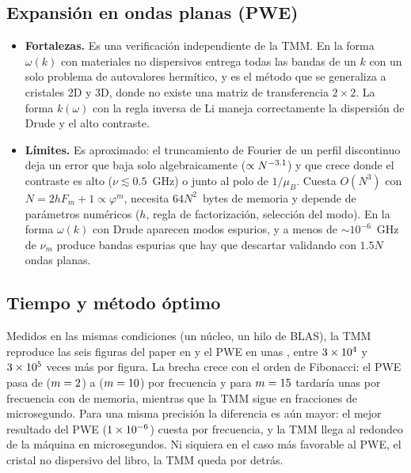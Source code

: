 \documentclass[11pt,a4paper]{article}
\begin{document}
\subsection*{Expansión en ondas planas (PWE)}

\begin{itemize}
\item \textbf{Fortalezas.} Es una verificación independiente de la TMM. En la
forma $\omega(k)$ con materiales no dispersivos entrega todas las bandas de un $k$
con un solo problema de autovalores hermítico, y es el método que se generaliza a
cristales 2D y 3D, donde no existe una matriz de transferencia $2\times2$. La forma
$k(\omega)$ con la regla inversa de Li maneja correctamente la dispersión de Drude
y el alto contraste.
\item \textbf{Límites.} Es aproximado: el truncamiento de Fourier de un perfil
discontinuo deja un error que baja solo algebraicamente
($\propto N^{-3.1}$) y que crece donde el contraste es alto
($\nu\lesssim0.5$~GHz) o junto al polo de $1/\mu_B$. Cuesta $O(N^3)$ con
$N=2hF_m+1\propto\varphi^m$, necesita $64N^2$~bytes de memoria y depende de
parámetros numéricos ($h$, regla de factorización, selección del modo). En la
forma $\omega(k)$ con Drude aparecen modos espurios, y a menos de
$\sim\!10^{-6}$~GHz de $\nu_m$ produce bandas espurias que hay que descartar
validando con $1.5N$ ondas planas.
\end{itemize}

\subsection*{Tiempo y método óptimo}

Medidos en las mismas condiciones (un núcleo, un hilo de BLAS), la TMM reproduce
las seis figuras del paper en \EffFigTmmTotal{} y el PWE en unas \EffFigPweTotal,
entre $3\times10^{4}$ y $3\times10^{5}$ veces más por figura. La brecha crece
con el orden de Fibonacci: el PWE pasa de \EffPweFirst{} ($m=2$) a
\EffPweLast{} ($m=10$) por frecuencia y para $m=15$ tardaría
unas \EffExtrapB{} por frecuencia con \EffExtrapBMem{} de memoria, mientras que la
TMM sigue en fracciones de microsegundo. Para una misma precisión la diferencia es
aún mayor: el mejor resultado del PWE ($1\times10^{-6}$) cuesta \EffWpBestTime{}
por frecuencia, y la TMM llega al redondeo de la máquina en microsegundos. Ni
siquiera en el caso más favorable al PWE, el cristal no dispersivo del libro, la
TMM queda por detrás.
\end{document}
